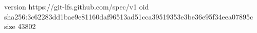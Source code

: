 version https://git-lfs.github.com/spec/v1
oid sha256:3c62283dd1bae9e81160daf96513ad51cca39519353e3be36e95f34eea07895c
size 43802
